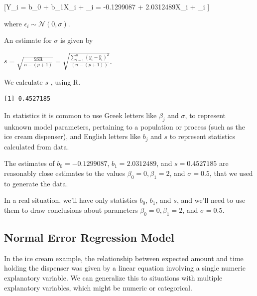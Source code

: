 \documentclass[
  letterpaper,
  DIV=11,
  numbers=noendperiod]{scrreprt}
\newenvironment{Shaded}{\begin{snugshade}}{\end{snugshade}}
\newcommand{\DecValTok}[1]{\textcolor[rgb]{0.68,0.00,0.00}{#1}}
\newcommand{\FunctionTok}[1]{\textcolor[rgb]{0.28,0.35,0.67}{#1}}
\newcommand{\NormalTok}[1]{\textcolor[rgb]{0.00,0.23,0.31}{#1}}
\newcommand{\OtherTok}[1]{\textcolor[rgb]{0.00,0.23,0.31}{#1}}
\newcommand{\SpecialCharTok}[1]{\textcolor[rgb]{0.37,0.37,0.37}{#1}}
\begin{document}
{[}Y\_i = b\_0 + b\_1X\_i + \epsilon\_i = -0.1299087 + 2.0312489X\_i +
\epsilon\_i {]}

where \(\epsilon_i\sim\mathcal{N}(0,\sigma)\).

An estimate for \(\sigma\) is given by

\(s =\sqrt{\frac{\text{SSR}}{n-(p+1)}} = \sqrt{\frac{\displaystyle\sum_{i=1}^n(y_i-\hat{y}_i)^2}{(n-(p+1))}}\).

We calculate \(s\) , using R.

\begin{Shaded}
\end{Shaded}

\begin{verbatim}
[1] 0.4527185
\end{verbatim}

In statistics it is common to use Greek letters like \(\beta_j\) and
\(\sigma\), to represent unknown model parameters, pertaining to a
population or process (such as the ice cream dispenser), and English
letters like \(b_j\) and \(s\) to represent statistics calculated from
data.

The estimates of \(b_0 = -0.1299087\), \(b_1=2.0312489\), and
\(s = 0.4527185\) are reasonably close estimates to the values
\(\beta_0=0, \beta_1=2\), and \(\sigma = 0.5\), that we used to generate
the data.

In a real situation, we'll have only statistics \(b_0\), \(b_1\), and
\(s\), and we'll need to use them to draw conclusions about parameters
\(\beta_0=0, \beta_1=2\), and \(\sigma = 0.5\).

\subsection{Normal Error Regression
Model}\label{normal-error-regression-model}

In the ice cream example, the relationship between expected amount and
time holding the dispenser was given by a linear equation involving a
single numeric explanatory variable. We can generalize this to
situations with multiple explanatory variables, which might be numeric
or categorical.
\end{document}
